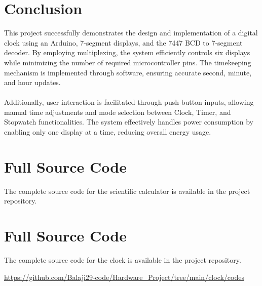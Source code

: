\documentclass[journal]{IEEEtran}
\begin{document}
\section{Conclusion}
This project successfully demonstrates the design and implementation of a digital clock using an Arduino, 7-segment displays, and the 7447 BCD to 7-segment decoder. By employing multiplexing, the system efficiently controls six displays while minimizing the number of required microcontroller pins. The timekeeping mechanism is implemented through software, ensuring accurate second, minute, and hour updates. \\ \\
Additionally, user interaction is facilitated through push-button inputs, allowing manual time adjustments and mode selection between Clock, Timer, and Stopwatch functionalities. The system effectively handles power consumption by enabling only one display at a time, reducing overall energy usage.

\section{Full Source Code}
The complete source code for the scientific calculator is available in the project repository.

\section{Full Source Code}
The complete source code for the clock is available in the project repository.

\url{https://github.com/Balaji29-code/Hardware_Project/tree/main/clock/codes}
\end{document}
